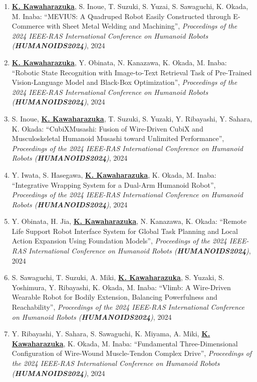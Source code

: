 \documentclass[letterpaper]{article}
\begin{document}
\begin{enumerate}
\item \underline{\textbf{K. Kawaharazuka}}, S. Inoue, T. Suzuki, S. Yuzai, S. Sawaguchi, K. Okada, M. Inaba: ``MEVIUS: A Quadruped Robot Easily Constructed through E-Commerce with Sheet Metal Welding and Machining'', \textit{Proceedings of the 2024 IEEE-RAS International Conference on Humanoid Robots (\textit{\textbf{HUMANOIDS2024}})}, 2024
\item \underline{\textbf{K. Kawaharazuka}}, Y. Obinata, N. Kanazawa, K. Okada, M. Inaba: ``Robotic State Recognition with Image-to-Text Retrieval Task of Pre-Trained Vision-Language Model and Black-Box Optimization'', \textit{Proceedings of the 2024 IEEE-RAS International Conference on Humanoid Robots (\textit{\textbf{HUMANOIDS2024}})}, 2024
\item S. Inoue, \underline{\textbf{K. Kawaharazuka}}, T. Suzuki, S. Yuzaki, Y. Ribayashi, Y. Sahara, K. Okada: ``CubiXMusashi: Fusion of Wire-Driven CubiX and Musculoskeletal Humanoid Musashi toward Unlimited Performance'', \textit{Proceedings of the 2024 IEEE-RAS International Conference on Humanoid Robots (\textit{\textbf{HUMANOIDS2024}})}, 2024
\item Y. Iwata, S. Hasegawa, \underline{\textbf{K. Kawaharazuka}}, K. Okada, M. Inaba: ``Integrative Wrapping System for a Dual-Arm Humanoid Robot'', \textit{Proceedings of the 2024 IEEE-RAS International Conference on Humanoid Robots (\textit{\textbf{HUMANOIDS2024}})}, 2024
\item Y. Obinata, H. Jia, \underline{\textbf{K. Kawaharazuka}}, N. Kanazawa, K. Okada: ``Remote Life Support Robot Interface System for Global Task Planning and Local Action Expansion Using Foundation Models'', \textit{Proceedings of the 2024 IEEE-RAS International Conference on Humanoid Robots (\textit{\textbf{HUMANOIDS2024}})}, 2024
\item S. Sawaguchi, T. Suzuki, A. Miki, \underline{\textbf{K. Kawaharazuka}}, S. Yuzaki, S. Yoshimura, Y. Ribayashi, K. Okada, M. Inaba: ``Vlimb: A Wire-Driven Wearable Robot for Bodily Extension, Balancing Powerfulness and Reachability'', \textit{Proceedings of the 2024 IEEE-RAS International Conference on Humanoid Robots (\textit{\textbf{HUMANOIDS2024}})}, 2024
\item Y. Ribayashi, Y. Sahara, S. Sawaguchi, K. Miyama, A. Miki, \underline{\textbf{K. Kawaharazuka}}, K. Okada, M. Inaba: ``Fundamental Three-Dimensional Configuration of Wire-Wound Muscle-Tendon Complex Drive'', \textit{Proceedings of the 2024 IEEE-RAS International Conference on Humanoid Robots (\textit{\textbf{HUMANOIDS2024}})}, 2024

\end{enumerate}
\end{document}
